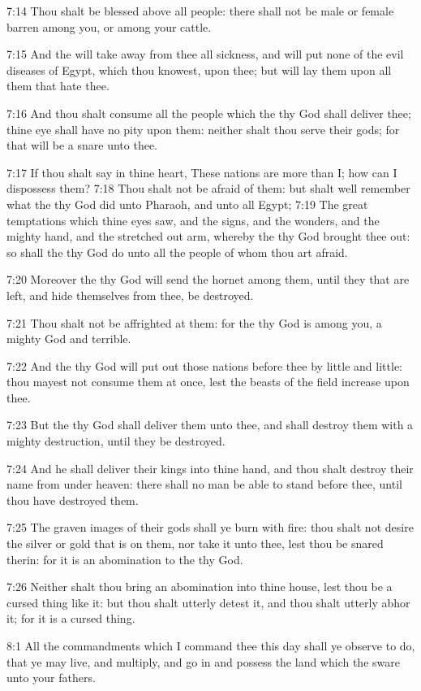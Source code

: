 7:14 Thou shalt be blessed above all people: there shall not be male or female barren among you, or among your cattle.

7:15 And the \LORD will take away from thee all sickness, and will put none of the evil diseases of Egypt, which thou knowest, upon thee; but will lay them upon all them that hate thee.

7:16 And thou shalt consume all the people which the \LORD thy God shall deliver thee; thine eye shall have no pity upon them: neither shalt thou serve their gods; for that will be a snare unto thee.

7:17 If thou shalt say in thine heart, These nations are more than I; how can I dispossess them?  7:18 Thou shalt not be afraid of them: but shalt well remember what the \LORD thy God did unto Pharaoh, and unto all Egypt; 7:19 The great temptations which thine eyes saw, and the signs, and the wonders, and the mighty hand, and the stretched out arm, whereby the \LORD thy God brought thee out: so shall the \LORD thy God do unto all the people of whom thou art afraid.

7:20 Moreover the \LORD thy God will send the hornet among them, until they that are left, and hide themselves from thee, be destroyed.

7:21 Thou shalt not be affrighted at them: for the \LORD thy God is among you, a mighty God and terrible.

7:22 And the \LORD thy God will put out those nations before thee by little and little: thou mayest not consume them at once, lest the beasts of the field increase upon thee.

7:23 But the \LORD thy God shall deliver them unto thee, and shall destroy them with a mighty destruction, until they be destroyed.

7:24 And he shall deliver their kings into thine hand, and thou shalt destroy their name from under heaven: there shall no man be able to stand before thee, until thou have destroyed them.

7:25 The graven images of their gods shall ye burn with fire: thou shalt not desire the silver or gold that is on them, nor take it unto thee, lest thou be snared therin: for it is an abomination to the \LORD thy God.

7:26 Neither shalt thou bring an abomination into thine house, lest thou be a cursed thing like it: but thou shalt utterly detest it, and thou shalt utterly abhor it; for it is a cursed thing.

8:1 All the commandments which I command thee this day shall ye observe to do, that ye may live, and multiply, and go in and possess the land which the \LORD sware unto your fathers.

